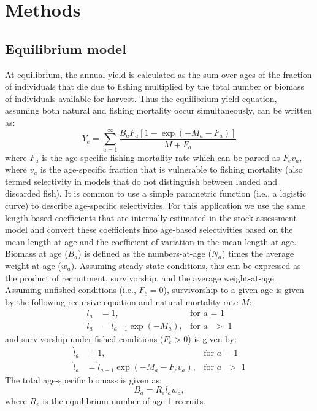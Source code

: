 \section*{Methods} %
\label{sec:methods}

\subsection*{Equilibrium model} %
\label{sub:equilibrium_model}
At equilibrium, the annual yield is calculated as the sum over ages of the fraction of individuals that die due to fishing multiplied by the total number or biomass of individuals available for harvest.  Thus the equilibrium yield equation, assuming both natural and fishing mortality occur simultaneously,  can be written as:
\begin{equation}\label{eq:Y_e}
	Y_e = \sum_{a=1}^\infty \frac{B_a F_a [1-\exp(-M_a-F_a)]}{M+F_a}
\end{equation}
where $F_a$ is the age-specific fishing mortality rate which can be parsed as $F_e v_a$, where $v_a$ is the age-specific fraction that is vulnerable to fishing mortality (also termed selectivity in models that do not distinguish between landed and discarded fish).  It is common to use a simple parametric function (i.e., a logistic curve) to describe age-specific selectivities.  For this application we use the same length-based coefficients that are internally estimated in the stock assessment model and convert these coefficients into age-based selectivities based on the mean length-at-age and the coefficient of variation in the mean length-at-age.  Biomass at age ($B_a$) is defined as the numbers-at-age ($N_a$) times the average weight-at-age ($w_a$).  Assuming steady-state conditions, this can be expressed as the product of recruitment, survivorship, and the average weight-at-age.  Assuming unfished conditions (i.e., $F_e=0$), survivorship to a given age is given by the following recursive equation and natural mortality rate $M$:
\begin{align}\label{eq:unfished_survivorship}
	l_a &= 1,  &\mbox{for $a$ = 1} \nonumber \\
	l_a &= l_{a-1} \exp(-M_a),& \mbox{for $a$ $>$ 1}
\end{align}
and survivorship under fished conditions ($F_e > 0$) is given by:
\begin{align}\label{eq:fished_survivorship}
	\acute{l}_a &=1, &\mbox{for $a$ = 1} \nonumber\\
	\acute{l}_{a} &= \acute{l}_{a-1} \exp(-M_a-F_e v_a), &\mbox{for $a$ $>$ 1} 
\end{align}
The total age-specific biomass  is given as:
\begin{equation} \label{eq:B_a}
	B_a = R_e l_a w_a,
\end{equation}
where $R_e$ is the equilibrium number of age-1 recruits.


